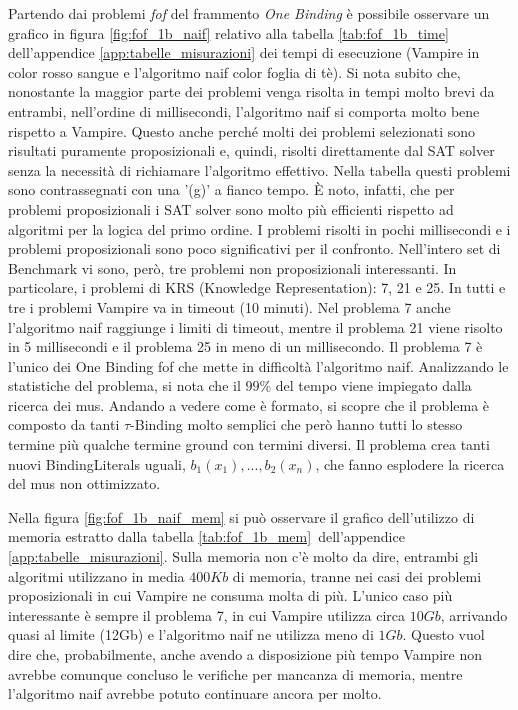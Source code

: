 \documentclass[./main.tex]{subfiles}
\begin{document}
Partendo dai problemi \textit{fof} del frammento \textit{One Binding} è possibile osservare un grafico in figura \ref{fig:fof_1b_naif}
relativo alla tabella \ref{tab:fof_1b_time} dell'appendice \ref{app:tabelle_misurazioni} dei tempi di esecuzione (Vampire in color rosso sangue e l'algoritmo naif color foglia di tè). 
Si nota subito che, nonostante la maggior parte dei problemi venga risolta in tempi molto brevi da entrambi, 
nell'ordine di millisecondi, l'algoritmo naif si comporta molto bene rispetto a Vampire.
Questo anche perché molti dei problemi selezionati sono risultati puramente proposizionali e, quindi, risolti direttamente dal SAT solver
senza la necessità di richiamare l'algoritmo effettivo.
Nella tabella questi problemi sono contrassegnati con una '(g)' a fianco tempo.
È noto, infatti, che per problemi proposizionali i SAT solver sono molto più efficienti rispetto ad algoritmi per la logica del primo ordine.
I problemi risolti in pochi millisecondi e i problemi proposizionali sono poco significativi per il confronto.
Nell'intero set di Benchmark vi sono, però, tre problemi non proposizionali interessanti. 
In particolare, i problemi di KRS (Knowledge Representation): 7, 21 e 25.
In tutti e tre i problemi Vampire va in timeout (10 minuti).
Nel problema 7 anche l'algoritmo naif raggiunge i limiti di timeout,
mentre il problema 21 viene risolto in 5 millisecondi e il problema 25 in meno di un millisecondo.
Il problema 7 è l'unico dei One Binding fof che mette in difficoltà l'algoritmo naif.
Analizzando le statistiche del problema, si nota che il $99\%$ del tempo viene impiegato dalla ricerca 
dei mus. 
Andando a vedere come è formato, si scopre che il problema è composto da tanti $\tau$-Binding 
molto semplici che però hanno tutti lo stesso termine più qualche termine ground con termini diversi.
Il problema crea tanti nuovi BindingLiterals uguali, $b_1(x_1), ..., b_2(x_n)$, che fanno esplodere la ricerca del mus non ottimizzato.

Nella figura \ref{fig:fof_1b_naif_mem} si può osservare il grafico dell'utilizzo di memoria estratto dalla tabella \ref{tab:fof_1b_mem}\
dell'appendice \ref{app:tabelle_misurazioni}.
Sulla memoria non c'è molto da dire, entrambi gli algoritmi utilizzano in media $400Kb$ di memoria, tranne nei casi
dei problemi proposizionali in cui Vampire ne consuma molta di più. 
L'unico caso più interessante è sempre il problema 7, in cui Vampire utilizza circa $10Gb$, 
arrivando quasi al limite (12Gb) e l'algoritmo naif ne utilizza meno di $1Gb$.
Questo vuol dire che, probabilmente, anche avendo a disposizione più tempo Vampire non avrebbe comunque concluso le verifiche
per mancanza di memoria, mentre l'algoritmo naif avrebbe potuto continuare ancora per molto.
\end{document}
